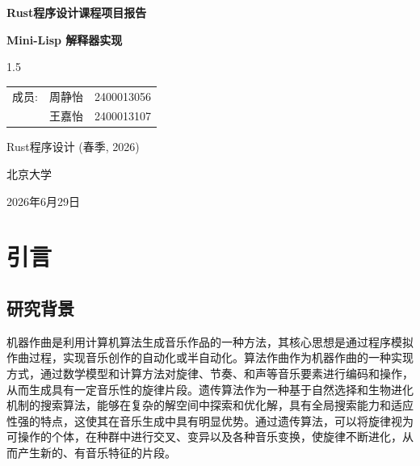 \documentclass[12pt, a4paper]{ctexart}
\begin{document}
\begin{titlepage}
    \centering
    \vspace*{2cm}
    {\Huge \bfseries Rust程序设计课程项目报告 \par}
    \vspace{1cm}
    {\Large \bfseries Mini-Lisp 解释器实现 \par}
    
    \vspace{3cm}
    
    \begin{spacing}{1.5}
    \large
    \begin{tabular}{llc}
        成员: & 周静怡 & 2400013056 \\
              & 王嘉怡 & 2400013107 \\
    \end{tabular}
    \end{spacing}

    \vfill
    {\large Rust程序设计 (春季, 2026) \par}
    {\large 北京大学 \par}
    {\large 2026年6月29日 \par}
\end{titlepage}

\newpage
\tableofcontents
\newpage


\section{引言}
\subsection{研究背景}
机器作曲是利用计算机算法生成音乐作品的一种方法，其核心思想是通过程序模拟作曲过程，实现音乐创作的自动化或半自动化。算法作曲作为机器作曲的一种实现方式，通过数学模型和计算方法对旋律、节奏、和声等音乐要素进行编码和操作，从而生成具有一定音乐性的旋律片段。遗传算法作为一种基于自然选择和生物进化机制的搜索算法，能够在复杂的解空间中探索和优化解，具有全局搜索能力和适应性强的特点，这使其在音乐生成中具有明显优势。通过遗传算法，可以将旋律视为可操作的个体，在种群中进行交叉、变异以及各种音乐变换，使旋律不断进化，从而产生新的、有音乐特征的片段。
\end{document}
